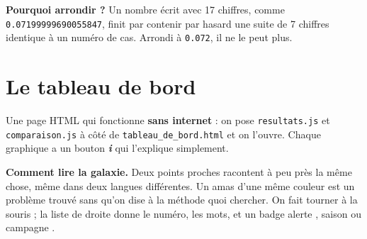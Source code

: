 \begin{enfant}
\textbf{Pourquoi arrondir ?} Un nombre écrit avec 17 chiffres, comme \texttt{0.07199999690055847},
finit par contenir par hasard une suite de 7 chiffres identique à un numéro de cas. Arrondi à
\texttt{0.072}, il ne le peut plus.
\end{enfant}

\section{Le tableau de bord}

Une page HTML qui fonctionne \textbf{sans internet} : on pose \texttt{resultats.js} et
\texttt{comparaison.js} à côté de \texttt{tableau\_de\_bord.html} et on l'ouvre. Chaque graphique a un
bouton {\color{accentblue}\textbf{\textit{i}}} qui l'explique simplement.


\begin{lire}
\textbf{Comment lire la galaxie.} Deux points proches racontent à peu près la même chose, même dans deux
langues différentes. Un amas d'une même couleur est un problème trouvé sans qu'on dise à la méthode quoi
chercher. On fait tourner à la souris ; la liste de droite donne le numéro, les mots, et un badge
\og alerte \fg, \og saison \fg{} ou \og campagne \fg.
\end{lire}

